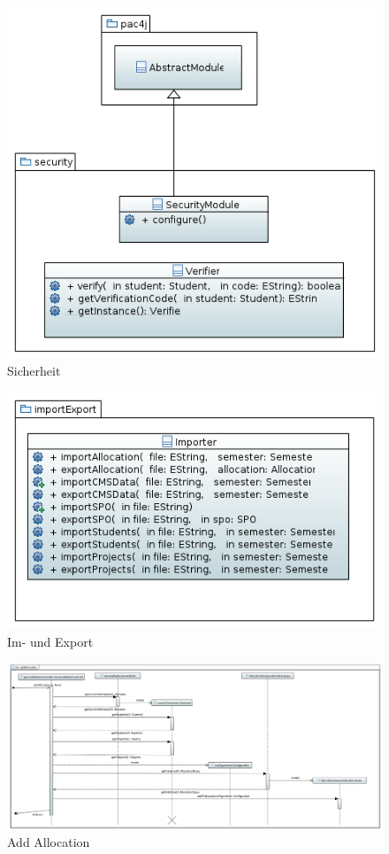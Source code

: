 \documentclass[parskip=full]{scrartcl}
\begin{document}
\begin{figure}[!htb]
\centering
\includegraphics[width=\linewidth]{bilder/security.png}
\caption{Sicherheit}
\label{uml:Sicherheit}
\end{figure}

\begin{figure}[!htb]
\centering
\includegraphics[width=\linewidth]{bilder/importExport.png}
\caption{Im- und Export}
\label{uml:imExport}
\end{figure}




\begin{figure}
\centering
\includegraphics[width=\linewidth]{bilder/seqAddAllocation.png}
\caption{Add Allocation}
\label{seq:addAlloction}
\end{figure}
\end{document}

